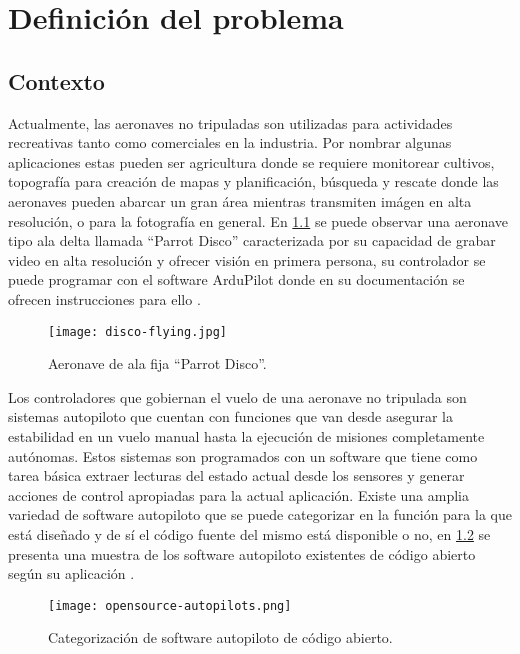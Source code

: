 \chapter{Definición del problema}

\section{Contexto}

Actualmente, las aeronaves no tripuladas son utilizadas para actividades recreativas tanto como comerciales en la industria. Por nombrar algunas aplicaciones estas pueden ser agricultura donde se requiere monitorear cultivos, topografía para creación de mapas y planificación, búsqueda y rescate donde las aeronaves pueden abarcar un gran área mientras transmiten imágen en alta resolución, o para la fotografía en general. En \cref{fig:disco} se puede observar una aeronave tipo ala delta llamada ``Parrot Disco'' caracterizada por su capacidad de grabar video en alta resolución y ofrecer visión en primera persona, su controlador se puede programar con el software ArduPilot donde en su documentación se ofrecen instrucciones para ello \cite{disco2}.

\begin{figure}[h]
    \centering
    \texttt{[image: disco-flying.jpg]}
    \caption{Aeronave de ala fija ``Parrot Disco''.}
    \label{fig:disco}
\end{figure}

Los controladores que gobiernan el vuelo de una aeronave no tripulada son sistemas autopiloto que cuentan con funciones que van desde asegurar la estabilidad en un vuelo manual hasta la ejecución de misiones completamente autónomas. Estos sistemas son programados con un software que tiene como tarea básica extraer lecturas del estado actual desde los sensores y generar acciones de control apropiadas para la actual aplicación. Existe una amplia variedad de software autopiloto que se puede categorizar en la función para la que está diseñado y de sí el código fuente del mismo está disponible o no, en \cref{fig:opensource-autopilots} se presenta una muestra de los software autopiloto existentes de código abierto según su aplicación \cite{survey}.

\begin{figure}[h]
    \centering
    \texttt{[image: opensource-autopilots.png]}
    \caption{Categorización de software autopiloto de código abierto.}
    \label{fig:opensource-autopilots}
\end{figure}

